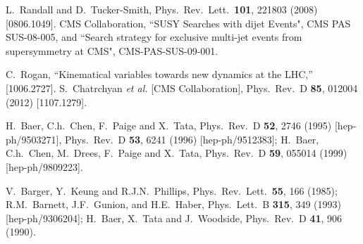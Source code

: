 \documentclass[11pt]{article}
\begin{document}
\begin{thebibliography}{999}
  L.~Randall and D.~Tucker-Smith,
  Phys.\ Rev.\ Lett.\  {\bf 101}, 221803 (2008)
  [0806.1049].
CMS Collaboration, ``SUSY Searches with dijet Events", CMS PAS SUS-08-005, and
``Search strategy for exclusive multi-jet events from supersymmetry at CMS",
CMS-PAS-SUS-09-001.

  C.~Rogan,
  ``Kinematical variables towards new dynamics at the LHC,''
  [1006.2727].
S.~Chatrchyan {\it et al.} [CMS Collaboration],
  Phys.\ Rev.\ D {\bf 85}, 012004 (2012)
  [1107.1279].
  
H.~Baer, C.h.~Chen, F.~Paige and X.~Tata,
  Phys.\ Rev.\ D {\bf 52}, 2746 (1995)
  [hep-ph/9503271],
  Phys.\ Rev.\ D {\bf 53}, 6241 (1996)
  [hep-ph/9512383];
H.~Baer, C.h.~Chen, M.~Drees, F.~Paige and X.~Tata,
  Phys.\ Rev.\ D {\bf 59}, 055014 (1999)
  [hep-ph/9809223].

V.~Barger, Y.~Keung and R.J.N.~Phillips, 
  Phys.\ Rev.\ Lett.\  {\bf 55}, 166 (1985);
R.M.~Barnett, J.F.~Gunion, and H.E.~Haber, 
  Phys.\ Lett.\ B {\bf 315}, 349 (1993)
  [hep-ph/9306204];
H.~Baer, X.~Tata and J.~Woodside, 
  Phys.\ Rev.\ D {\bf 41}, 906 (1990).


\end{thebibliography}
\end{document}
